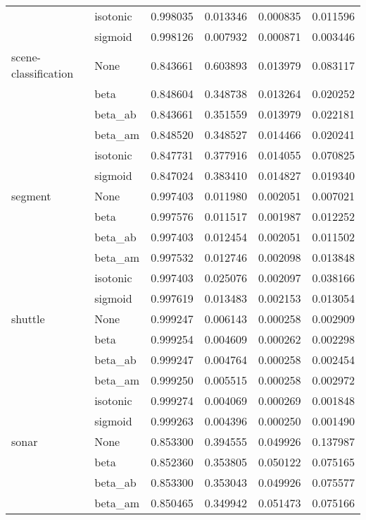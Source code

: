 \begin{tabular}{llrrrr}
        & isotonic &  0.998035 &  0.013346 &  0.000835 &  0.011596 \\
        & sigmoid &  0.998126 &  0.007932 &  0.000871 &  0.003446 \\
scene-classification & None &  0.843661 &  0.603893 &  0.013979 &  0.083117 \\
        & beta &  0.848604 &  0.348738 &  0.013264 &  0.020252 \\
        & beta\_ab &  0.843661 &  0.351559 &  0.013979 &  0.022181 \\
        & beta\_am &  0.848520 &  0.348527 &  0.014466 &  0.020241 \\
        & isotonic &  0.847731 &  0.377916 &  0.014055 &  0.070825 \\
        & sigmoid &  0.847024 &  0.383410 &  0.014827 &  0.019340 \\
segment & None &  0.997403 &  0.011980 &  0.002051 &  0.007021 \\
        & beta &  0.997576 &  0.011517 &  0.001987 &  0.012252 \\
        & beta\_ab &  0.997403 &  0.012454 &  0.002051 &  0.011502 \\
        & beta\_am &  0.997532 &  0.012746 &  0.002098 &  0.013848 \\
        & isotonic &  0.997403 &  0.025076 &  0.002097 &  0.038166 \\
        & sigmoid &  0.997619 &  0.013483 &  0.002153 &  0.013054 \\
shuttle & None &  0.999247 &  0.006143 &  0.000258 &  0.002909 \\
        & beta &  0.999254 &  0.004609 &  0.000262 &  0.002298 \\
        & beta\_ab &  0.999247 &  0.004764 &  0.000258 &  0.002454 \\
        & beta\_am &  0.999250 &  0.005515 &  0.000258 &  0.002972 \\
        & isotonic &  0.999274 &  0.004069 &  0.000269 &  0.001848 \\
        & sigmoid &  0.999263 &  0.004396 &  0.000250 &  0.001490 \\
sonar & None &  0.853300 &  0.394555 &  0.049926 &  0.137987 \\
        & beta &  0.852360 &  0.353805 &  0.050122 &  0.075165 \\
        & beta\_ab &  0.853300 &  0.353043 &  0.049926 &  0.075577 \\
        & beta\_am &  0.850465 &  0.349942 &  0.051473 &  0.075166 \\

\end{tabular}

